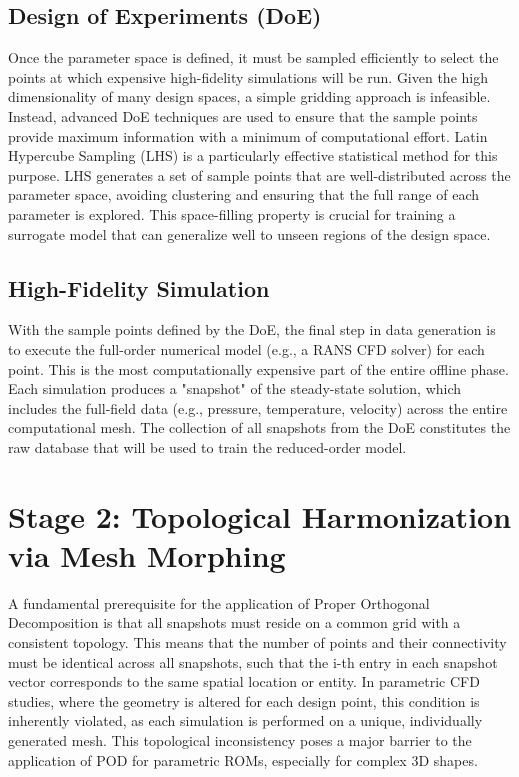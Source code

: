 \documentclass[dsc, EN]{ufabcFHZh}
\begin{document}
{\subsection{Design of Experiments (DoE)}

Once the parameter space is defined, it must be sampled efficiently to select the points at which expensive high-fidelity simulations will be run. Given the high dimensionality of many design spaces, a simple gridding approach is infeasible. Instead, advanced DoE techniques are used to ensure that the sample points provide maximum information with a minimum of computational effort. Latin Hypercube Sampling (LHS) is a particularly effective statistical method for this purpose. LHS generates a set of sample points that are well-distributed across the parameter space, avoiding clustering and ensuring that the full range of each parameter is explored. This space-filling property is crucial for training a surrogate model that can generalize well to unseen regions of the design space.

\subsection{High-Fidelity Simulation}

With the sample points defined by the DoE, the final step in data generation is to execute the full-order numerical model (e.g., a RANS CFD solver) for each point. This is the most computationally expensive part of the entire offline phase. Each simulation produces a "snapshot" of the steady-state solution, which includes the full-field data (e.g., pressure, temperature, velocity) across the entire computational mesh. The collection of all snapshots from the DoE constitutes the raw database that will be used to train the reduced-order model. 

\section{Stage 2: Topological Harmonization via Mesh Morphing}

A fundamental prerequisite for the application of Proper Orthogonal Decomposition is that all snapshots must reside on a common grid with a consistent topology. This means that the number of points and their connectivity must be identical across all snapshots, such that the i-th entry in each snapshot vector corresponds to the same spatial location or entity. In parametric CFD studies, where the geometry is altered for each design point, this condition is inherently violated, as each simulation is performed on a unique, individually generated mesh. This topological inconsistency poses a major barrier to the application of POD for parametric ROMs, especially for complex 3D shapes. 

}
\end{document}

